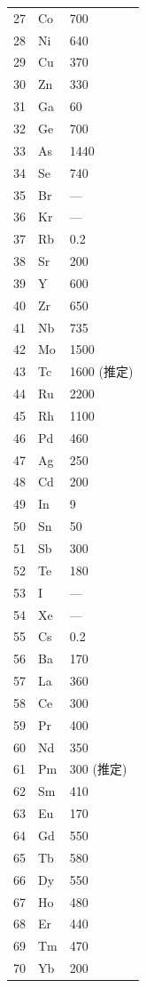\documentclass[11pt,a4paper]{article}
\theoremstyle{remark}
\begin{document}
\begin{longtable}{p{0.6cm}p{1.2cm}p{2.5cm}}
		27 & Co & 700 \\
		28 & Ni & 640 \\
		29 & Cu & 370 \\
		30 & Zn & 330 \\
		31 & Ga & 60 \\
		32 & Ge & 700 \\
		33 & As & 1440 \\
		34 & Se & 740 \\
		35 & Br & — \\
		36 & Kr & — \\
		37 & Rb & 0.2 \\
		38 & Sr & 200 \\
		39 & Y  & 600 \\
		40 & Zr & 650 \\
		41 & Nb & 735 \\
		42 & Mo & 1500 \\
		43 & Tc & 1600 (推定) \\
		44 & Ru & 2200 \\
		45 & Rh & 1100 \\
		46 & Pd & 460 \\
		47 & Ag & 250 \\
		48 & Cd & 200 \\
		49 & In & 9 \\
		50 & Sn & 50 \\
		51 & Sb & 300 \\
		52 & Te & 180 \\
		53 & I  & — \\
		54 & Xe & — \\
		55 & Cs & 0.2 \\
		56 & Ba & 170 \\
		57 & La & 360 \\
		58 & Ce & 300 \\
		59 & Pr & 400 \\
		60 & Nd & 350 \\
		61 & Pm & 300 (推定) \\
		62 & Sm & 410 \\
		63 & Eu & 170 \\
		64 & Gd & 550 \\
		65 & Tb & 580 \\
		66 & Dy & 550 \\
		67 & Ho & 480 \\
		68 & Er & 440 \\
		69 & Tm & 470 \\
		70 & Yb & 200 \\

\end{longtable}
\end{document}
